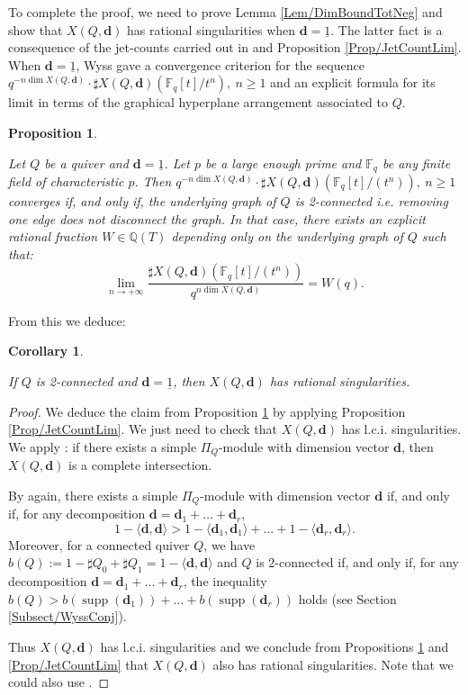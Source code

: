 \documentclass[11pt,english]{article}
\numberwithin{equation}{section}
\numberwithin{figure}{section}
\theoremstyle{definition}
\theoremstyle{plain}
\newtheorem{prop}[df]{Proposition}
\newtheorem{cor}[df]{Corollary}
\theoremstyle{remark}
\DeclareMathOperator{\supp}{supp}
\newcommand\dd{\mathbf{d}}
\begin{document}
To complete the proof, we need to prove Lemma \ref{Lem/DimBoundTotNeg}
and show that $X(Q,\dd)$ has rational singularities when $\dd=\underline{1}$.
The latter fact is a consequence of the jet-counts carried out in
\cite{Wys17b} and Proposition \ref{Prop/JetCountLim}. When $\dd=\underline{1}$,
Wyss gave a convergence criterion for the sequence $q^{-n\dim X(Q,\dd)}\cdot\sharp X(Q,\dd)(\mathbb{F}_{q}[t]/t^{n}),\ n\geq1$
and an explicit formula for its limit in terms of the graphical hyperplane
arrangement associated to $Q$.

\begin{prop}{\cite[Cor. 4.27.]{Wys17b}} \label{Prop/ToricFormulaB}

Let $Q$ be a quiver and $\dd=\underline{1}$. Let $p$ be a large
enough prime and $\mathbb{F}_{q}$ be any finite field of characteristic
$p$. Then $q^{-n\dim X(Q,\dd)}\cdot\sharp X(Q,\dd)(\mathbb{F}_{q}[t]/(t^{n})),\ n\geq1$
converges if, and only if, the underlying graph of $Q$ is 2-connected
i.e. removing one edge does not disconnect the graph. In that case,
there exists an explicit rational fraction $W\in\mathbb{Q}(T)$ depending
only on the underlying graph of $Q$ such that:\[
\underset{n\rightarrow+\infty}{\lim}\frac{\sharp X(Q,\dd)(\mathbb{F}_{q}[t]/(t^{n}))}{q^{n\dim X(Q,\dd)}}=W(q).
\]\end{prop}

From this we deduce:

\begin{cor} \label{Cor/RatSgToric}

If $Q$ is 2-connected and $\dd=\underline{1}$, then $X(Q,\dd)$
has rational singularities.

\end{cor}

\begin{proof}

We deduce the claim from Proposition \ref{Prop/ToricFormulaB} by
applying Proposition \ref{Prop/JetCountLim}. We just need to check
that $X(Q,\dd)$ has l.c.i. singularities. We apply \cite[Thm. 1.2.]{CB01}:
if there exists a simple $\Pi_{Q}$-module with dimension vector $\dd$,
then $X(Q,\dd)$ is a complete intersection.

By \cite[Thm. 1.2.]{CB01} again, there exists a simple $\Pi_{Q}$-module
with dimension vector $\dd$ if, and only if, for any decomposition
$\dd=\dd_{1}+\ldots+\dd_{r}$, \[
1-\langle\dd,\dd\rangle>1-\langle\dd_1,\dd_1\rangle+\ldots+1-\langle\dd_r,\dd_r\rangle.
\]Moreover, for a connected quiver $Q$, we have $b(Q):=1-\sharp Q_{0}+\sharp Q_{1}=1-\langle\dd,\dd\rangle$
and $Q$ is $2$-connected if, and only if, for any decomposition
$\dd=\dd_{1}+\ldots+\dd_{r}$, the inequality $b(Q)>b(\supp(\dd_{1}))+\ldots+b(\supp(\dd_{r}))$
holds (see Section \ref{Subsect/WyssConj}).

Thus $X(Q,\dd)$ has l.c.i. singularities and we conclude from Propositions
\ref{Prop/ToricFormulaB} and \ref{Prop/JetCountLim} that $X(Q,\dd)$
also has rational singularities. Note that we could also use \cite[Thm. 2.11.]{HSS21}.
\end{proof}
\end{document}

